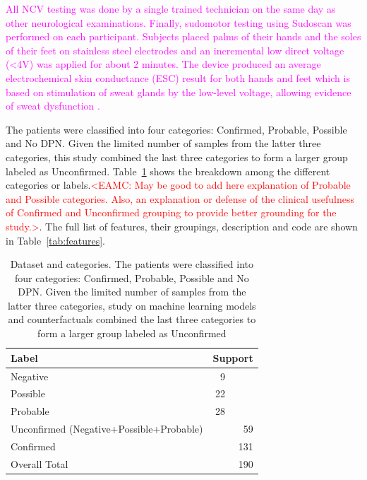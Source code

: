 \documentclass[fleqn,10pt]{wlscirep}
\begin{document}
\textcolor{magenta}{
All NCV testing was done by a single trained technician on the same day as other
neurological examinations. Finally, sudomotor testing using Sudoscan was performed on each participant. Subjects placed palms of their hands and the soles of their feet on stainless steel electrodes and an incremental low direct voltage (<4V) was applied for about 2 minutes. The device produced an average electrochemical skin conductance (ESC) result for both hands and feet which is based on stimulation of sweat glands by the low-level voltage, allowing evidence of sweat dysfunction \cite{garcia2022detection}.
}

The patients were classified into four categories: Confirmed, Probable, Possible and No DPN.  Given the limited number of samples from the latter three categories, this study combined the last three categories to form a larger group  labeled as Unconfirmed. Table~\ref{tab:data_categ} shows the breakdown among the different categories or labels.\textcolor{red}{<EAMC: May be good to add here explanation of Probable and Possible categories. Also, an explanation or defense of the clinical usefulness of Confirmed and Unconfirmed grouping to provide better grounding for the study.>}. The full list of features, their groupings, description and code are shown in Table~\ref{tab:features}.

\begin{table}[h!]
\centering
\small
\begin{tabular}{lrr}
\toprule
Label & \multicolumn{2}{c}{Support}  \\
\midrule
Negative  &  9 \\
Possible  & 22 \\
Probable  & 28  \\
Unconfirmed (Negative+Possible+Probable) & &59 \\
Confirmed & & 131 \\
Overall Total & & 190 \\
\bottomrule
\end{tabular}
\caption{Dataset and categories. The patients were classified into four categories: Confirmed, Probable, Possible and No DPN. Given the limited number of samples from the latter three categories, study on machine learning models and counterfactuals combined the last three categories to form a larger group labeled as Unconfirmed}
\label{tab:data_categ}
\end{table}
\end{document}
